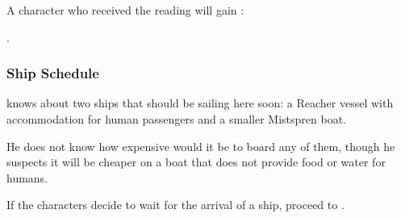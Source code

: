 A character who received the reading will gain \abilityFutureKnowledgeName[1]{}:

\abilityFutureKnowledge{}.


\subsubsection{Ship Schedule}

\npcFortuneReader{} knows about two ships that should be sailing here soon: a Reacher vessel with accommodation for human passengers and a smaller Mistspren boat. 

He does not know how expensive would it be to board any of them, though he suspects it will be cheaper on a boat that does not provide food or water for humans.

If the characters decide to wait for the arrival of a ship, proceed to . 